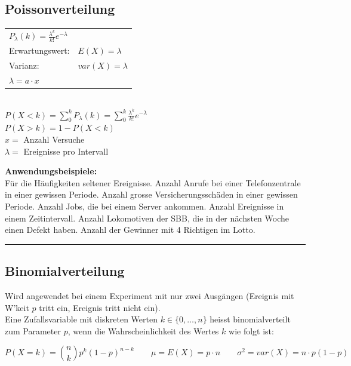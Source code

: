 	\subsection{Poissonverteilung }
	\begin{multicols}{2}
		\begin{tabular}{ll}
        $P_\lambda(k)=\frac{\lambda^k}{k!}e^{-\lambda}$ & \\
        Erwartungswert:  & $E(X)=\lambda$\\
        Varianz:  & $var(X)=\lambda$ \\
        $\lambda = a \cdot x$ \\
        \end{tabular} \\
         $P(X<k) = \sum_0^k P_\lambda(k)=\sum_0^k \frac{\lambda^k}{k!}e^{-\lambda}$ \\
         $P(X>k) = 1-P(X<k)$ \\
        $x =$ Anzahl Versuche\\
        $\lambda =$ Ereignisse pro Intervall
        \columnbreak
        
        {\bf Anwendungsbeispiele:} \\ Für die Häufigkeiten seltener
        Ereignisse. Anzahl Anrufe bei einer Telefonzentrale in einer gewissen
        Periode. Anzahl grosse Versicherungsschäden in einer gewissen Periode.
        Anzahl Jobs, die bei einem Server ankommen. Anzahl Ereignisse in
        einem Zeitintervall. Anzahl Lokomotiven der SBB, die in der nächsten Woche 
        einen Defekt haben. Anzahl der Gewinner mit 4 Richtigen im Lotto.
     \end{multicols}
        

\hrule

		\subsection{Binomialverteilung }
		
    	Wird angewendet bei einem Experiment mit nur zwei Ausgängen (Ereignis mit W'keit $p$ tritt
    	ein, Ereignis tritt nicht ein). \\
    	Eine Zufallsvariable mit diskreten Werten $k \in \{
    	0,\ldots,n \}$ heisst binomialverteilt zum Parameter $p$, wenn die
        Wahrscheinlichkeit des Wertes $k$ wie folgt ist:

      $$P(X=k) = \binom n k p^k(1-p)^{n-k} \qquad \mu = E(X) = p \cdot n \qquad \sigma^2 =
      var(X) = n \cdot p (1-p)$$

